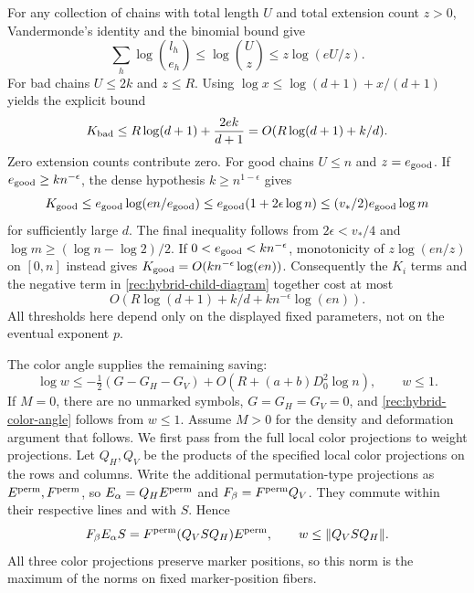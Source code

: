 For any collection of chains with total length $U$ and total
extension count $z>0$, Vandermonde's identity and the binomial bound
give
\[
 \sum_h\log\binom{l_h}{e_h}
 \le\log\binom Uz\le z\log(eU/z).
\]
For bad chains $U\le2k$ and $z\le R$. Using
$\log x\le\log(d+1)+x/(d+1)$ yields the explicit bound
\[
 K_{\rm bad}\le
 R\log(d+1)+\frac{2ek}{d+1}
 =O(R\log(d+1)+k/d).
\]
Zero extension counts contribute zero.
For good chains $U\le n$ and $z=e_{\rm good}$.
If $e_{\rm good}\ge k n^{-\epsilon}$, the dense hypothesis
$k\ge n^{1-\epsilon}$ gives
\[
 K_{\rm good}\le
 e_{\rm good}\log(en/e_{\rm good})
 \le e_{\rm good}(1+2\epsilon\log n)
 \le (v_*/2)e_{\rm good}\log m
\]
for sufficiently large $d$. The final inequality follows from
$2\epsilon<v_*/4$ and
$\log m\ge(\log n-\log2)/2$.
If $0<e_{\rm good}<k n^{-\epsilon}$, monotonicity of
$z\log(en/z)$ on $[0,n]$ instead gives
$K_{\rm good}=O(k n^{-\epsilon}\log(en))$.
Consequently the $K_i$ terms and the negative term in
\eqref{rec:hybrid-child-diagram} together cost at most
\begin{equation}\label{s:hybrid-extension-cost}
 O\!\left(R\log(d+1)+k/d+k n^{-\epsilon}\log(en)\right).
\end{equation}
All thresholds here depend only on the displayed fixed parameters,
not on the eventual exponent $p$.

The color angle supplies the remaining saving:
\begin{equation}\label{rec:hybrid-color-angle}
 \log w\le-\tfrac12(G-G_H-G_V)
                    +O(R+(a+b)D_0^2\log n),\qquad w\le1.
\end{equation}
If $M=0$, there are no unmarked symbols, $G=G_H=G_V=0$, and
\eqref{rec:hybrid-color-angle} follows from $w\le1$.  Assume $M>0$
for the density and deformation argument that follows.
We first pass from the full local color projections to weight
projections. Let $Q_H,Q_V$ be the products of the specified local
color projections on the rows and columns. Write the additional
permutation-type projections as $E^{\rm perm},F^{\rm perm}$, so
$E_\alpha=Q_HE^{\rm perm}$ and $F_\beta=F^{\rm perm}Q_V$.
They commute within their respective lines and with $S$. Hence
\[
 F_\beta E_\alpha S
   =F^{\rm perm}(Q_V S Q_H)E^{\rm perm},
 \qquad w\le\|Q_V S Q_H\|.
\]
All three color projections preserve marker positions, so this norm
is the maximum of the norms on fixed marker-position fibers.

